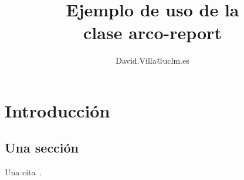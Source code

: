 \documentclass{arco-report}
\title{Ejemplo de uso de la\\clase arco-report}
\author{David.Villa@uclm.es}
\begin{document}
\maketitle


\chapter{Introducción}

\section{Una sección}


Una cita~\cite{Cannon}.


\end{document}
